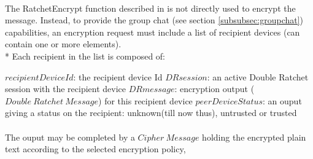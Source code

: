 \documentclass[a4paper,11pt]{article}
\begin{document}
      \paragraph{}The RatchetEncrypt function described in \cite[section 3.4]{doubleRatchet} is not directly used to encrypt the message. Instead, to provide the group chat (see section \ref{subsubsec:groupchat}) capabilities, an encryption request must include a list of recipient devices (can contain one or more elements).\\*
      Each recipient in the list is composed of:
        \begin{algorithmic}
          \State $recipientDeviceId$: the recipient device Id
          \State $DRsession$: an active Double Ratchet session with the recipient device
          \State $DRmessage$: encryption output ($Double\ Ratchet\ Message$) for this recipient device
          \State $peerDeviceStatus$: an ouput giving a status on the recipient: unknown(till now thus), untrusted or trusted
        \end{algorithmic}
      \paragraph{}The ouput may be completed by a $Cipher\ Message$ holding the encrypted plain text according to the selected encryption policy,
\end{document}
